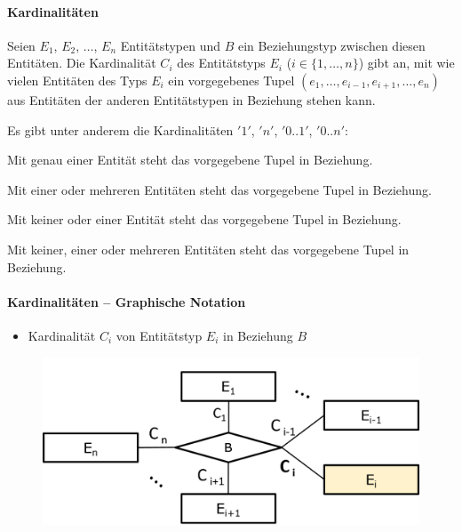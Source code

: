 %
%
\begin{frame}{\insertsection}
\framesubtitle{Kardinalit\"aten}
\begin{definition}\label{carddef}
	Seien $E_1$, $E_2$, $\ldots$, $E_n$ Entit\"atstypen und $B$ ein Beziehungstyp zwischen diesen 
	Entit\"aten. 
	\abs
	Die Kardinalit\"at $C_i$ des Entit\"atstyps $E_i$ ($i\in\{1,\ldots,n\}$) gibt an, mit wie vielen 
	Entit\"aten des Typs $E_i$ ein vorgegebenes Tupel $(e_1,\ldots,e_{i-1},e_{i+1},\ldots,e_n)$ 	
	aus Entit\"aten der anderen Entit\"atstypen in Beziehung stehen kann.
\end{definition}
\abs\onslide\pause 
Es gibt unter anderem die Kardinalit\"aten $'1'$, $'n'$, $'0..1'$, $'0..n'$:
\begin{description}[leftmargin=0cm]
	\item[$1$:] Mit genau einer Entit\"at steht das vorgegebene Tupel in Beziehung.
	\item[$n$:] Mit einer oder mehreren Entit\"aten steht das vorgegebene Tupel in Beziehung.
	\item[$0..1$:] Mit keiner oder einer Entit\"at steht das vorgegebene Tupel in Beziehung.
	\item[$0..n$:] Mit keiner, einer oder mehreren Entit\"aten steht das vorgegebene Tupel in Beziehung.
\end{description}
\end{frame}

\begin{frame}{\insertsection}
\framesubtitle{Kardinalit\"aten -- Graphische Notation}
\begin{itemize}
	\item Kardinalit\"at $C_i$ von Entit\"atstyp $E_i$ in Beziehung $B$
\end{itemize}
\begin{figure}
	\includegraphics[scale=0.5]{img/ERM-Kardinalitaet.png}
\end{figure}  
\end{frame}

